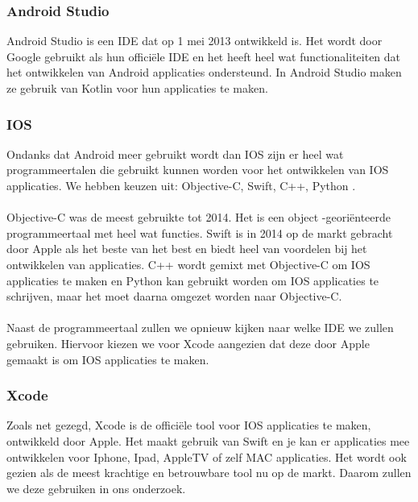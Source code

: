 \subsubsection{Android Studio}
Android Studio is een IDE dat op 1 mei 2013 ontwikkeld is. Het wordt door Google gebruikt 
als hun officiële IDE en het heeft heel wat functionaliteiten dat het ontwikkelen van Android 
applicaties ondersteund. In Android Studio maken ze gebruik van Kotlin voor hun applicaties te 
maken. \autocite{JavaTpoint2019}

\subsubsection{IOS}
Ondanks dat Android meer gebruikt wordt dan IOS zijn er heel wat programmeertalen die gebruikt 
kunnen worden voor het ontwikkelen van IOS applicaties. We hebben keuzen uit: Objective-C, Swift, 
C++, Python \autocite{Sahu2020}. 
\\\\
Objective-C was de meest gebruikte tot 2014. Het is een object -georiënteerde programmeertaal 
met heel wat functies. Swift is in 2014 op de markt gebracht door Apple als het beste van het 
best en biedt heel van voordelen bij het ontwikkelen van applicaties. C++ wordt gemixt met Objective-C 
om IOS applicaties te maken en Python kan gebruikt worden om IOS applicaties te schrijven, maar 
het moet daarna omgezet worden naar Objective-C. \autocite{Sahu2020} 
\\\\
Naast de programmeertaal zullen we opnieuw kijken naar welke IDE we zullen gebruiken. Hiervoor 
kiezen we voor Xcode aangezien dat deze door Apple gemaakt is om IOS applicaties te maken. 
\autocite{TechCommuters2020} 
\subsubsection{Xcode}
Zoals net gezegd, Xcode is de officiële tool voor IOS applicaties te maken, ontwikkeld door 
Apple. Het maakt gebruik van Swift en je kan er applicaties mee ontwikkelen voor Iphone, Ipad, 
AppleTV of zelf MAC applicaties. Het wordt ook gezien als de meest krachtige en betrouwbare tool 
nu op de markt\autocite{TechCommuters2020}. Daarom zullen we deze gebruiken in ons onderzoek.

